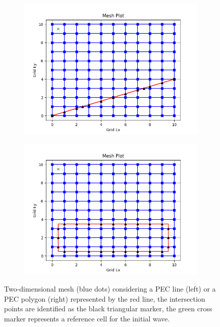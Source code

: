 \documentclass[12pt, oneside]{book}
\begin{document}
\begin{figure}[H]
    \centering
    \begin{subfigure}[b]{0.49\textwidth}
        \centering
        \includegraphics[width=\textwidth]{Imagenes/CFDTD2D_MeshPECLine.png}
    \end{subfigure}
    \begin{subfigure}[b]{0.49\textwidth}
        \centering
        \includegraphics[width=\textwidth]{Imagenes/CFDTD2D_MeshPECPolygon.png}
    \end{subfigure}
    \caption{Two-dimensional mesh (blue dots) considering a PEC line (left) or a PEC polygon (right) represented by the red line, the intersection points are identified as the black triangular marker, the green cross marker represents a reference cell for the initial wave.}
    \label{fig:CFDTD2D_MeshPEC}
\end{figure}
\end{document}
